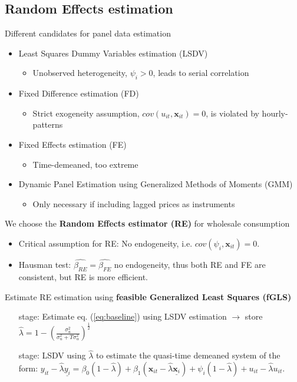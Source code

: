 \subsection{Random Effects estimation}
\label{subsec:e_re}
Different candidates for panel data estimation
\begin{itemize}
    \item Least Squares Dummy Variables estimation (LSDV)
    \begin{itemize}
        \item Unobserved heterogeneity, $\psi_i>0$, leads to serial correlation
    \end{itemize}
    \item Fixed Difference estimation (FD)
    \begin{itemize}
        \item Strict exogeneity assumption, $cov(u_{it},\bm{x}_{it})=0$, is violated by hourly-patterns
    \end{itemize}
    \item Fixed Effects estimation (FE)
    \begin{itemize}
        \item Time-demeaned, too extreme
    \end{itemize}
    \item Dynamic Panel Estimation using Generalized Methods of Moments (GMM)
    \begin{itemize}
        \item Only necessary if including lagged prices as instruments
    \end{itemize}
\end{itemize}
We choose the \textbf{Random Effects estimator (RE)} for wholesale consumption
\begin{itemize}
    \item Critical assumption for RE: No endogeneity, i.e. $cov(\psi_i,\bm{x}_{it})=0$.
    \item Hausman test: $\widehat{\beta_{RE}}=\widehat{\beta_{FE}}$ no endogeneity, thus both RE and FE are consistent, but RE is more efficient.
\end{itemize}
Estimate RE estimation using \textbf{feasible Generalized Least Squares (fGLS)}
\begin{itemize}
    \item[\nth{1} stage:] Estimate eq. (\ref{eq:baseline}) using LSDV estimation $\rightarrow$ store $\widehat{\lambda}=1-\left(\frac{\sigma^2_u}{\sigma^2_u+T\sigma^2_\alpha}\right)^\frac{1}{2}$
    \item[\nth{2} stage:] LSDV using $\widehat{\lambda}$ to estimate the quasi-time demeaned system of the form: $y_{it}-\widehat{\lambda}\underline{y_i}=\beta_0(1-\widehat{\lambda})+\beta_1(\bm{x}_{it}-\widehat{\lambda}\underline{\bm{x}_i})+\psi_i(1-\widehat{\lambda})+u_{it}-\widehat{\lambda}u_{it}$.
\end{itemize}

